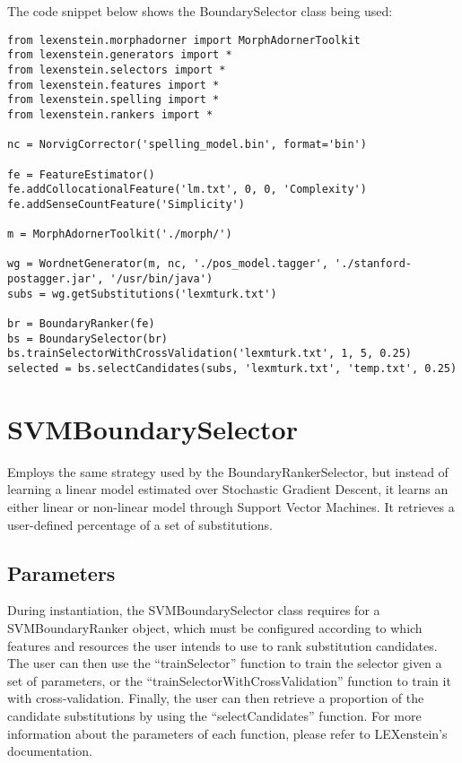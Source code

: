 The code snippet below shows the BoundarySelector class being used:

\begin{lstlisting}
from lexenstein.morphadorner import MorphAdornerToolkit
from lexenstein.generators import *
from lexenstein.selectors import *
from lexenstein.features import *
from lexenstein.spelling import *
from lexenstein.rankers import *

nc = NorvigCorrector('spelling_model.bin', format='bin')

fe = FeatureEstimator()
fe.addCollocationalFeature('lm.txt', 0, 0, 'Complexity')
fe.addSenseCountFeature('Simplicity')

m = MorphAdornerToolkit('./morph/')

wg = WordnetGenerator(m, nc, './pos_model.tagger', './stanford-postagger.jar', '/usr/bin/java')
subs = wg.getSubstitutions('lexmturk.txt')

br = BoundaryRanker(fe)
bs = BoundarySelector(br)
bs.trainSelectorWithCrossValidation('lexmturk.txt', 1, 5, 0.25)
selected = bs.selectCandidates(subs, 'lexmturk.txt', 'temp.txt', 0.25)
\end{lstlisting}










\section{SVMBoundarySelector}

Employs the same strategy used by the BoundaryRankerSelector, but instead of learning a linear model estimated over Stochastic Gradient Descent, it learns an either linear or non-linear model through Support Vector Machines. It retrieves a user-defined percentage of a set of substitutions.

\subsection{Parameters}

During instantiation, the SVMBoundarySelector class requires for a SVMBoundaryRanker object, which must be configured according to which features and resources the user intends to use to rank substitution candidates. The user can then use the ``trainSelector'' function to train the selector given a set of parameters, or the ``trainSelectorWithCrossValidation'' function to train it with cross-validation. Finally, the user can then retrieve a proportion of the candidate substitutions by using the ``selectCandidates'' function. For more information about the parameters of each function, please refer to LEXenstein's documentation.

